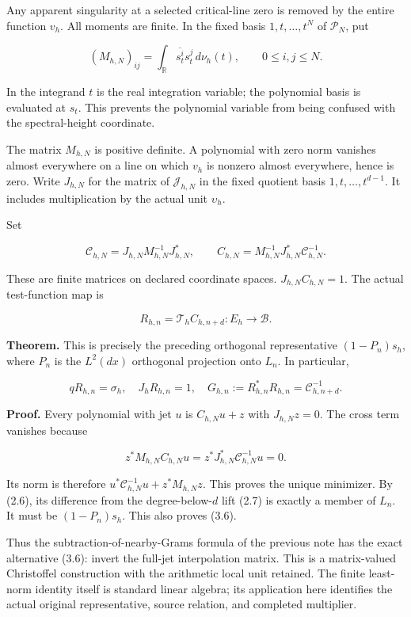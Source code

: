 Any apparent singularity at a selected critical-line zero is removed by
the entire function \(v_h\). All moments are finite. In the fixed basis
\(1,t,\ldots,t^N\) of \(\mathcal P_N\), put

\[(M_{h,N})_{ij}=\int_{\mathbb R}\overline{s_t^i}s_t^j\,d\nu_h(t),\qquad 0\le i,j\le N.\tag{3.3}\]

In the integrand \(t\) is the real integration variable; the polynomial
basis is evaluated at \(s_t\). This prevents the polynomial variable
from being confused with the spectral-height coordinate.

The matrix \(M_{h,N}\) is positive definite. A polynomial with zero norm
vanishes almost everywhere on a line on which \(v_h\) is nonzero almost
everywhere, hence is zero. Write \(J_{h,N}\) for the matrix of
\(\mathcal J_{h,N}\) in the fixed quotient basis \(1,t,\ldots,t^{d-1}\).
It includes multiplication by the actual unit \(\upsilon_h\).

Set

\[\boxed{\mathcal C_{h,N}=J_{h,N}M_{h,N}^{-1}J_{h,N}^*,\qquad
C_{h,N}=M_{h,N}^{-1}J_{h,N}^*\mathcal C_{h,N}^{-1}.}\tag{3.4}\]

These are finite matrices on declared coordinate spaces.
\(J_{h,N}C_{h,N}=1\). The actual test-function map is

\[R_{h,n}=\mathcal T_h C_{h,n+d}:E_h\longrightarrow\mathscr B.\tag{3.5}\]

\textbf{Theorem.} This is precisely the preceding orthogonal
representative \((1-P_n)s_h\), where \(P_n\) is the \(L^2(dx)\)
orthogonal projection onto \(L_n\). In particular,

\[\boxed{qR_{h,n}=\sigma_h,\quad J_hR_{h,n}=1,\quad
G_{h,n}:=R_{h,n}^*R_{h,n}=\mathcal C_{h,n+d}^{-1}.}\tag{3.6}\]

\textbf{Proof.} Every polynomial with jet \(u\) is \(C_{h,N}u+z\) with
\(J_{h,N}z=0\). The cross term vanishes because

\[z^*M_{h,N}C_{h,N}u=z^*J_{h,N}^*\mathcal C_{h,N}^{-1}u=0.\]

Its norm is therefore \(u^*\mathcal C_{h,N}^{-1}u+z^*M_{h,N}z\). This
proves the unique minimizer. By (2.6), its difference from the
degree-below-\(d\) lift (2.7) is exactly a member of \(L_n\). It must be
\((1-P_n)s_h\). This also proves (3.6).

Thus the subtraction-of-nearby-Grams formula of the previous note has
the exact alternative (3.6): invert the full-jet interpolation matrix.
This is a matrix-valued Christoffel construction with the arithmetic
local unit retained. The finite least-norm identity itself is standard
linear algebra; its application here identifies the actual original
representative, source relation, and completed multiplier.

